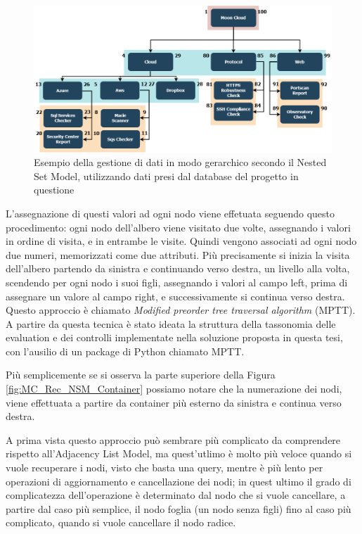 \begin{figure}[ht!]
	\includegraphics[scale=0.40]{images/MC_Rec_NSM_Tree.png}
	\caption{Esempio della gestione di dati in modo gerarchico secondo il Nested Set Model, utilizzando dati presi dal database del 
	progetto in questione}
	\label{fig:MC_Rec_NSM_Tree}
\end{figure}

L'assegnazione di questi valori ad ogni nodo viene effetuata seguendo questo procedimento: ogni nodo dell'albero viene visitato due volte, 
assegnando i valori in ordine di visita, e in entrambe le visite. Quindi vengono associati ad ogni nodo due numeri, memorizzati come 
due attributi. 
Più precisamente si inizia la visita dell'albero partendo da sinistra e continuando verso destra, un livello alla volta, scendendo per ogni
nodo i suoi figli, assegnando i valori al campo left, prima di assegnare un valore al campo right, e successivamente si continua verso 
destra. Questo approccio è chiamato \textit{Modified preorder tree traversal algorithm} (MPTT). A partire da questa tecnica è stato 
ideata la struttura della tassonomia delle evaluation e dei controlli implementate nella soluzione proposta in questa tesi, con 
l'ausilio di un package di Python chiamato MPTT.

Più semplicemente se si osserva la parte superiore della Figura \ref{fig:MC_Rec_NSM_Container} possiamo notare che la numerazione dei nodi, viene
effettuata a partire da container più esterno da sinistra e continua verso destra.

A prima vista questo approccio può sembrare più complicato da comprendere rispetto all'Adjacency List Model, ma quest'utlimo è
molto più veloce quando si vuole recuperare i nodi, visto che basta una query, mentre è più lento per operazioni di aggiornamento e 
cancellazione dei nodi; in quest ultimo il grado di complicatezza dell'operazione è determinato dal nodo che si vuole cancellare, a 
partire dal caso più semplice, il nodo foglia (un nodo senza figli) fino al caso più complicato, quando si vuole cancellare il nodo 
radice.


